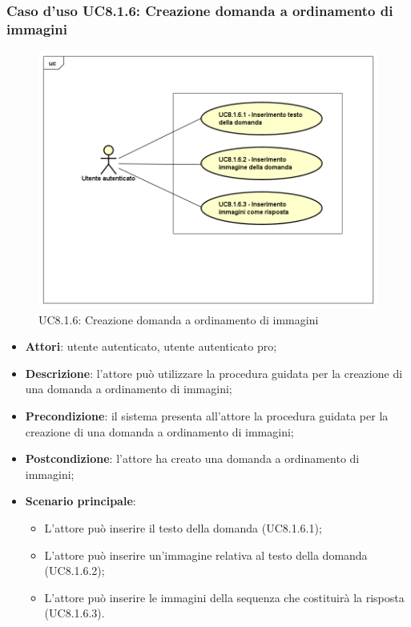 \subsubsection{Caso d'uso UC8.1.6: Creazione domanda a ordinamento di immagini}
\label{UC8.1.6}
	\begin{figure}[ht]
		\centering
			\includegraphics[scale=0.45,keepaspectratio]{UML/UC8_1_6.png}
		\caption{UC8.1.6: Creazione domanda a ordinamento di immagini}
	\end{figure}
	\FloatBarrier
\begin{itemize}
	\item\textbf{Attori}: utente autenticato, utente autenticato pro;
	\item\textbf{Descrizione}: l'attore può utilizzare la procedura guidata per la creazione di una domanda a ordinamento di immagini;
	\item\textbf{Precondizione}: il sistema presenta all'attore la procedura guidata per la creazione di una domanda a ordinamento di immagini; 
	\item \textbf{Postcondizione}: l'attore ha creato una domanda a ordinamento di immagini;
	\item\textbf{Scenario principale}:
	\begin{itemize}
		\item L'attore può inserire il testo della domanda (UC8.1.6.1);
		\item L'attore può inserire un'immagine relativa al testo della domanda (UC8.1.6.2);
		\item L'attore può inserire le immagini della sequenza che costituirà la risposta (UC8.1.6.3).
	\end{itemize}
\end{itemize}


